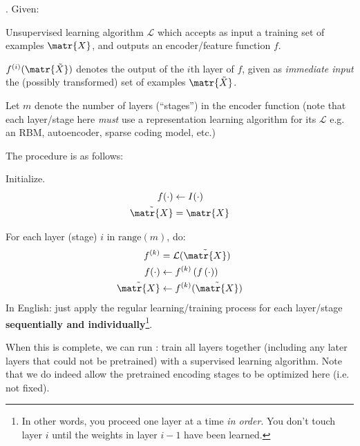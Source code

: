 \documentclass[11pt]{article}
\newcommand\myspace[1][]{\vspace{#1\bigskipamount}}
\newcommand\p{\Needspace{10\baselineskip} \noindent}
\begin{document}
\myspace
\p {}. Given:
\begin{compactitem}[-]
	\item Unsupervised learning algorithm $\mathcal{L}$ which accepts as input a training set of examples $\matr{X}$, and outputs an encoder/feature function $f$. 
	\item $f^{(i)}(\matr{\tilde{X}})$ denotes the output of the $i$th layer of $f$, given as \textit{immediate input} the (possibly transformed) set of examples $\matr{\tilde{X}}$.
	\item Let $m$ denote the number of layers (``stages'') in the encoder function (note that each layer/stage here \textit{must} use a representation learning algorithm for its $\mathcal{L}$ e.g. an RBM, autoencoder, sparse coding model, etc.)
\end{compactitem}
The procedure is as follows:
\begin{compactenum}
	\item Initialize.
	\begin{align}
		f(\cdot) &\leftarrow I(\cdot) \\
		\tilde{\matr{X}} &= \matr{X}
	\end{align}
	
	\item For each layer (stage) $i$ in $\text{range}(m)$, do:
	\begin{align}
		f^{(k)} &= \mathcal{L}(\tilde{\matr{X}}) \\
		f(\cdot) &\leftarrow  f^{(k)}\left(f\left(\cdot\right)\right) \\
		\tilde{\matr{X}} &\leftarrow f^{(k)}(\tilde{\matr{X}})
	\end{align}
	In English: just apply the regular learning/training process for each layer/stage \textbf{sequentially and individually}\footnote{In other words, you proceed one layer at a time \textit{in order}. You don't touch layer $i$ until the weights in layer $i - 1$ have been learned.}.
\end{compactenum}
When this is complete, we can run : train all layers together (including any later layers that could not be pretrained) with a supervised learning algorithm. Note that we do indeed allow the pretrained encoding stages to be optimized here (i.e. not fixed).

% 
% 
\end{document}
